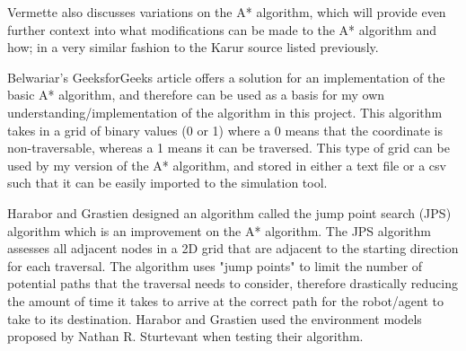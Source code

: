 Vermette \cite{vermette2011survey} also discusses variations on the A* algorithm, which will provide even further context into what modifications can be made to the A* algorithm and how; in a very similar fashion to the Karur source listed previously.
\par
Belwariar's \cite{belwariar_2021} GeeksforGeeks article offers a solution for an implementation of the basic A* algorithm, and therefore can be used as a basis for my own understanding/implementation of the algorithm in this project. This algorithm takes in a grid of binary values (0 or 1) where a 0 means that the coordinate is non-traversable, whereas a 1 means it can be traversed. This type of grid can be used by my version of the A* algorithm, and stored in either a text file or a csv such that it can be easily imported to the simulation tool.
\par
Harabor and Grastien \cite{harabor2011online} designed an algorithm called the jump point search (JPS) algorithm which is an improvement on the A* algorithm. The JPS algorithm assesses all adjacent nodes in a 2D grid that are adjacent to the starting direction for each traversal. The algorithm uses "jump points" to limit the number of potential paths that the traversal needs to consider, therefore drastically reducing the amount of time it takes to arrive at the correct path for the robot/agent to take to its destination. Harabor and Grastien used the environment models proposed by Nathan R. Sturtevant \cite{sturtevant2012benchmarks} when testing their algorithm.
